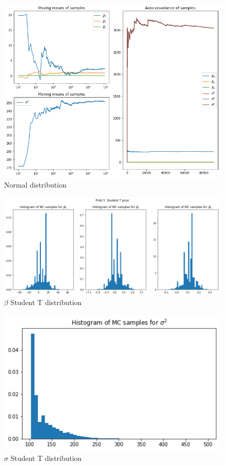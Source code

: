 \documentclass{article}
\begin{document}
\begin{figure}[h!]
\centering
\includegraphics[scale=0.45]{HW4P53.png}
\caption{Normal distribution}
\end{figure}

\begin{figure}[h!]
\centering
\includegraphics[scale=0.45]{HW4P54.png}
\caption{$\beta$ Student T distribution}
\end{figure}

\begin{figure}[h!]
\centering
\includegraphics[scale=0.45]{HW4P55.png}
\caption{$\sigma$ Student T distribution}
\end{figure}
\end{document}
